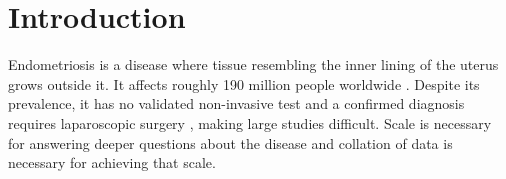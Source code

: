%
%

\section*{Introduction}

Endometriosis is a disease where tissue resembling the inner lining of the
uterus grows outside it. It affects roughly 190 million people worldwide 
\citep{who2025endometriosis}. Despite its prevalence, it has no validated 
non-invasive test and a confirmed diagnosis requires laparoscopic surgery 
\citep{who2025endometriosis,bontempo2025diagnostic}, making large studies 
difficult. Scale is necessary for answering deeper questions about 
the disease and collation of data is necessary for achieving that scale.

